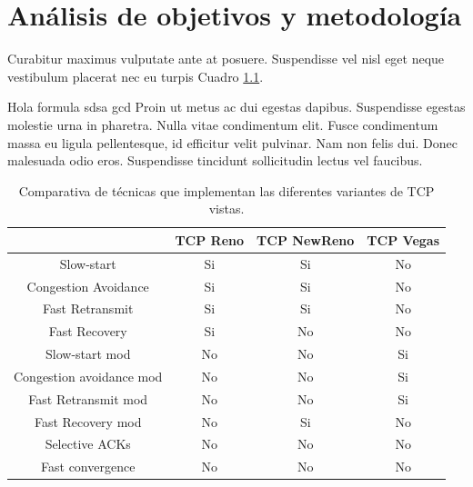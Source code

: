\chapter{Análisis de objetivos y metodología}

Curabitur maximus vulputate ante at posuere. Suspendisse vel nisl eget neque vestibulum placerat nec eu turpis Cuadro \ref{tab:comparativa-tecnicas}.

Hola \gls{formula} sdsa  \acrfull{gcd} Proin ut metus ac dui egestas dapibus. Suspendisse egestas molestie urna in pharetra. Nulla vitae condimentum elit. Fusce condimentum massa eu ligula pellentesque, id efficitur velit pulvinar. Nam non felis dui. Donec malesuada odio eros. Suspendisse tincidunt sollicitudin lectus vel faucibus.

\begin{table}[!ht]
	\begin{centering}
		\begin{tabular}{c|c|c|c}
 & TCP Reno & TCP NewReno & TCP Vegas \\ 
\hline  
Slow-start & Si & Si & No\\ 
 
Congestion Avoidance & Si & Si  & No\\ 
 
Fast Retransmit & Si & Si & No \\ 
 
Fast Recovery & Si & No & No \\ 
 
Slow-start mod & No & No & Si  \\ 
 
Congestion avoidance mod & No & No & Si \\ 
 
Fast Retransmit mod & No & No & Si\\ 
 
Fast Recovery mod & No & Si & No \\ 
 
Selective ACKs & No & No & No\\ 
 
Fast convergence & No & No & No \\ 
 
\end{tabular} 
	\caption{Comparativa de técnicas que implementan las diferentes variantes de TCP vistas.}
		\label{tab:comparativa-tecnicas}
	\end{centering}
\end{table}

